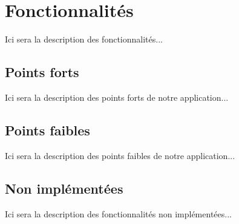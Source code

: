 \section{Fonctionnalités}
Ici sera la description des fonctionnalités...
\subsection{Points forts}
Ici sera la description des points forts de notre application...
\subsection{Points faibles}
Ici sera la description des points faibles de notre application...
\subsection{Non implémentées}
Ici sera la description des fonctionnalités non implémentées...


